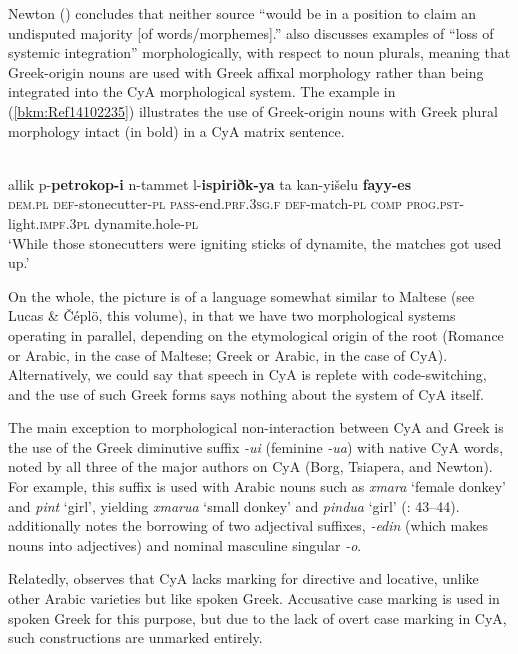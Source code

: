 \documentclass[output=paper]{langsci/langscibook}
\begin{document}
Newton (\citeyear[50]{Newton1964}) concludes that neither source “would be in a position to claim an undisputed majority [of words/morphemes].” \citet{Gulle2016} also discusses examples of “loss of systemic integration” morphologically, with respect to noun plurals, meaning that Greek-origin nouns are used with Greek affixal morphology rather than being integrated into the CyA morphological system. The example in (\ref{bkm:Ref14102235}) illustrates the use of Greek-origin nouns with Greek plural morphology intact (in bold) in a CyA matrix sentence.

\ea\label{bkm:Ref14102235}
\\
\gll allik p-\textbf{petrokop-i} n-tammet l-\textbf{ispiriðk-ya} ta kan-yišelu \textbf{fayy-es}\\
     \textsc{dem}.\textsc{pl} \textsc{def}{}-stonecutter-\textsc{pl} \textsc{pass-}end.\textsc{prf.3sg.f} \textsc{def-}match-\textsc{pl} \textsc{comp} \textsc{prog.pst-}light.\textsc{impf.3pl} dynamite.hole-\textsc{pl}\\
\glt ‘While those stonecutters were igniting sticks of dynamite, the matches got used up.’
\z

On the whole, the picture is of a language somewhat similar to Maltese (see Lucas \& Čéplö, this volume), in that we have two morphological systems operating in parallel, depending on the etymological origin of the root (Romance or Arabic, in the case of Maltese; Greek or Arabic, in the case of CyA). Alternatively, we could say that speech in CyA is replete with code-switching, and the use of such Greek forms says nothing about the system of CyA itself.

The main exception to morphological non-interaction between CyA and Greek is the use of the Greek diminutive suffix \textit{{}-ui} (feminine \textit{{}-ua}) with native CyA words, noted by all three of the major authors on CyA (Borg, Tsiapera, and Newton). For example, this suffix is used with Arabic nouns such as \textit{xmara} ‘female donkey’ and \textit{pint} `girl', yielding \textit{xmarua} ‘small donkey’ and \textit{pindua} ‘girl’ (\citealt{Newton1964}: 43–44). \citet{Tsiapera1964} additionally notes the borrowing of two adjectival suffixes, \textit{{}-edin} (which makes nouns into adjectives) and nominal masculine singular \textit{{}-o}. 

Relatedly, \citet{Gulle2016} observes that CyA lacks marking for directive and locative, unlike other Arabic varieties but like spoken Greek. Accusative case marking is used in spoken Greek for this purpose, but due to the lack of overt case marking in CyA, such constructions are unmarked entirely. 
\end{document}
